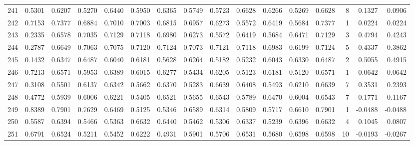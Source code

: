 \begin{tabular}{lrrrrrrrrrrrrrrr}
241 &      0.5301 &  0.6207 &  0.5270 &  0.6440 &  0.5950 &  0.6365 &  0.5749 &  0.5723 &  0.6628 &  0.6266 &   0.5269 &     0.6628 &      8 &                    0.1327 &                     0.0906 \\
242 &      0.7153 &  0.7377 &  0.6884 &  0.7010 &  0.7003 &  0.6815 &  0.6957 &  0.6273 &  0.5572 &  0.6419 &   0.5684 &     0.7377 &      1 &                    0.0224 &                     0.0224 \\
243 &      0.2335 &  0.6578 &  0.7035 &  0.7129 &  0.7118 &  0.6980 &  0.6273 &  0.5572 &  0.6419 &  0.5684 &   0.6471 &     0.7129 &      3 &                    0.4794 &                     0.4243 \\
244 &      0.2787 &  0.6649 &  0.7063 &  0.7075 &  0.7120 &  0.7124 &  0.7073 &  0.7121 &  0.7118 &  0.6983 &   0.6199 &     0.7124 &      5 &                    0.4337 &                     0.3862 \\
245 &      0.1432 &  0.6347 &  0.6487 &  0.6040 &  0.6181 &  0.5628 &  0.6264 &  0.5182 &  0.5232 &  0.6043 &   0.6330 &     0.6487 &      2 &                    0.5055 &                     0.4915 \\
246 &      0.7213 &  0.6571 &  0.5953 &  0.6389 &  0.6015 &  0.6277 &  0.5434 &  0.6205 &  0.5123 &  0.6181 &   0.5120 &     0.6571 &      1 &                   -0.0642 &                    -0.0642 \\
247 &      0.3108 &  0.5501 &  0.6137 &  0.6342 &  0.5662 &  0.6370 &  0.5283 &  0.6639 &  0.6408 &  0.5493 &   0.6210 &     0.6639 &      7 &                    0.3531 &                     0.2393 \\
248 &      0.4772 &  0.5939 &  0.6006 &  0.6221 &  0.5405 &  0.6521 &  0.5655 &  0.6543 &  0.5789 &  0.6470 &   0.6004 &     0.6543 &      7 &                    0.1771 &                     0.1167 \\
249 &      0.8389 &  0.7901 &  0.7629 &  0.6469 &  0.5125 &  0.5346 &  0.6589 &  0.6314 &  0.5809 &  0.5717 &   0.6610 &     0.7901 &      1 &                   -0.0488 &                    -0.0488 \\
250 &      0.5587 &  0.6394 &  0.5466 &  0.5363 &  0.6632 &  0.6440 &  0.5462 &  0.5306 &  0.6337 &  0.5239 &   0.6396 &     0.6632 &      4 &                    0.1045 &                     0.0807 \\
251 &      0.6791 &  0.6524 &  0.5211 &  0.5452 &  0.6222 &  0.4931 &  0.5901 &  0.5706 &  0.6531 &  0.5680 &   0.6598 &     0.6598 &     10 &                   -0.0193 &                    -0.0267 \\

\end{tabular}
